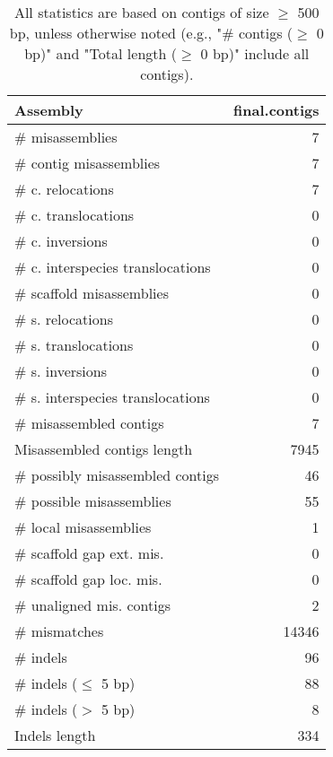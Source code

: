 \documentclass[12pt,a4paper]{article}
\begin{document}
\begin{table}[ht]
\begin{center}
\caption{All statistics are based on contigs of size $\geq$ 500 bp, unless otherwise noted (e.g., "\# contigs ($\geq$ 0 bp)" and "Total length ($\geq$ 0 bp)" include all contigs).}
\begin{tabular}{|l*{1}{|r}|}
\hline
Assembly & final.contigs \\ \hline
\# misassemblies & 7 \\ \hline
\hspace{2mm}\# contig misassemblies & 7 \\ \hline
\hspace{5mm}\# c. relocations & 7 \\ \hline
\hspace{5mm}\# c. translocations & 0 \\ \hline
\hspace{5mm}\# c. inversions & 0 \\ \hline
\hspace{5mm}\# c. interspecies translocations & 0 \\ \hline
\hspace{2mm}\# scaffold misassemblies & 0 \\ \hline
\hspace{5mm}\# s. relocations & 0 \\ \hline
\hspace{5mm}\# s. translocations & 0 \\ \hline
\hspace{5mm}\# s. inversions & 0 \\ \hline
\hspace{5mm}\# s. interspecies translocations & 0 \\ \hline
\# misassembled contigs & 7 \\ \hline
Misassembled contigs length & 7945 \\ \hline
\# possibly misassembled contigs & 46 \\ \hline
\hspace{5mm}\# possible misassemblies & 55 \\ \hline
\# local misassemblies & 1 \\ \hline
\# scaffold gap ext. mis. & 0 \\ \hline
\# scaffold gap loc. mis. & 0 \\ \hline
\# unaligned mis. contigs & 2 \\ \hline
\# mismatches & 14346 \\ \hline
\# indels & 96 \\ \hline
\hspace{5mm}\# indels ($\leq$ 5 bp) & 88 \\ \hline
\hspace{5mm}\# indels ($>$ 5 bp) & 8 \\ \hline
Indels length & 334 \\ \hline
\end{tabular}
\end{center}
\end{table}
\end{document}
